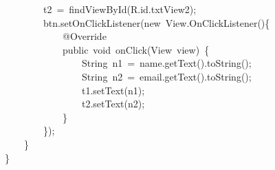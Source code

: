 {\ttfamily\small \ \ \ \ \ \ \ \ t2\ =\ findViewById(R.id.txtView2);} \\
{\ttfamily\small \ \ \ \ \ \ \ \ btn.setOnClickListener(new\ View.OnClickListener()\{} \\
{\ttfamily\small \ \ \ \ \ \ \ \ \ \ \ \ @Override} \\
{\ttfamily\small \ \ \ \ \ \ \ \ \ \ \ \ public\ void\ onClick(View\ view)\ \{} \\
{\ttfamily\small \ \ \ \ \ \ \ \ \ \ \ \ \ \ \ \ String\ n1\ =\ name.getText().toString();} \\
{\ttfamily\small \ \ \ \ \ \ \ \ \ \ \ \ \ \ \ \ String\ n2\ =\ email.getText().toString();} \\
{\ttfamily\small \ \ \ \ \ \ \ \ \ \ \ \ \ \ \ \ t1.setText(n1);} \\
{\ttfamily\small \ \ \ \ \ \ \ \ \ \ \ \ \ \ \ \ t2.setText(n2);} \\
{\ttfamily\small \ \ \ \ \ \ \ \ \ \ \ \ \}} \\
{\ttfamily\small \ \ \ \ \ \ \ \ \});} \\
{\ttfamily\small \ \ \ \ \}} \\
{\ttfamily\small \}} \\
